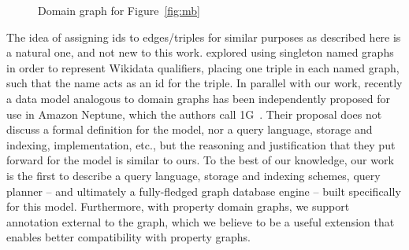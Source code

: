 \begin{figure}[t]
\setlength{\vgap}{0.8cm}
\setlength{\hgap}{1.6cm}
\centering
{}
\caption{Domain graph for Figure~\ref{fig:mb} \label{fig:dg}}
\end{figure}

The idea of assigning ids to edges/triples for similar purposes as described here is a natural one, and not new to this work. \citet{HernandezHK15} explored using singleton named graphs in order to represent Wikidata qualifiers, placing one triple in each named graph, such that the name acts as an id for the triple. In parallel with our work, recently a data model analogous to domain graphs has been independently proposed for use in Amazon Neptune, which the authors call 1G~\cite{LassilaSBBBKKLST}. Their proposal does not discuss a formal definition for the model, nor a query language, storage and indexing, implementation, etc., but the reasoning and justification that they put forward for the model is similar to ours. To the best of our knowledge, our work is the first to describe a query language, storage and indexing schemes, query planner -- and ultimately a fully-fledged graph database engine -- built specifically for this model. Furthermore, with property domain graphs, we support annotation external to the graph, which we believe to be a useful extension that enables better compatibility with property graphs.

